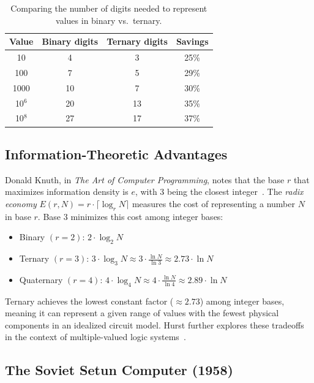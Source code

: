\documentclass[11pt,a4paper]{article}
\begin{document}
\begin{table}[H]
  \centering
  \caption{Comparing the number of digits needed to represent values in
           binary vs.\ ternary.}
  \label{tab:digit-comparison}
  \begin{tabular}{c|c|c|c}
    \textbf{Value} & \textbf{Binary digits} & \textbf{Ternary digits}
    & \textbf{Savings} \\ \hline
    10    & 4  & 3  & 25\% \\
    100   & 7  & 5  & 29\% \\
    1000  & 10 & 7  & 30\% \\
    10$^6$ & 20 & 13 & 35\% \\
    10$^8$ & 27 & 17 & 37\%
  \end{tabular}
\end{table}

\subsection{Information-Theoretic Advantages}

Donald Knuth, in \emph{The Art of Computer Programming}, notes that the
base $r$ that maximizes information density is $e$, with 3 being the
closest integer~\cite{knuth2003balanced}.  The \emph{radix economy}
$E(r, N) = r \cdot \lceil \log_r N \rceil$ measures the cost of
representing a number $N$ in base $r$.  Base 3 minimizes this cost among
integer bases:

\begin{itemize}
  \item Binary $(r=2)$: $2 \cdot \log_2 N$
  \item Ternary $(r=3)$: $3 \cdot \log_3 N \approx 3 \cdot \frac{\ln N}{\ln 3}
        \approx 2.73 \cdot \ln N$
  \item Quaternary $(r=4)$: $4 \cdot \log_4 N \approx 4 \cdot
        \frac{\ln N}{\ln 4} \approx 2.89 \cdot \ln N$
\end{itemize}

Ternary achieves the lowest constant factor ($\approx 2.73$) among integer
bases, meaning it can represent a given range of values with the fewest
physical components in an idealized circuit model.  Hurst further explores
these tradeoffs in the context of multiple-valued logic
systems~\cite{hurst1990multiple}.

\subsection{The Soviet Setun Computer (1958)}
\end{document}
